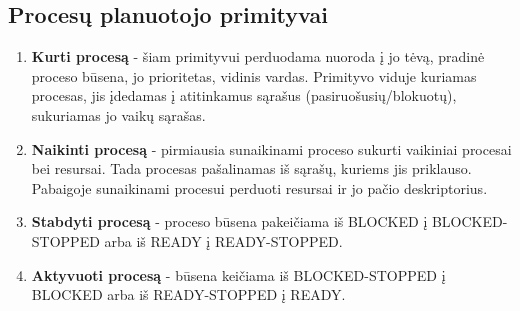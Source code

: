 	\subsection{Procesų planuotojo primityvai}
		\begin{enumerate}
			\item \textbf{Kurti procesą} - šiam primityvui perduodama nuoroda į jo tėvą, pradinė proceso būsena, jo prioritetas, vidinis vardas. Primityvo viduje kuriamas procesas, jis įdedamas į atitinkamus sąrašus (pasiruošusių/blokuotų), sukuriamas jo vaikų sąrašas.
			\item \textbf{Naikinti procesą} - pirmiausia sunaikinami proceso sukurti vaikiniai procesai bei resursai. Tada procesas pašalinamas iš sąrašų, kuriems jis priklauso. Pabaigoje sunaikinami procesui perduoti resursai ir jo pačio deskriptorius.
			\item \textbf{Stabdyti procesą} - proceso būsena pakeičiama iš BLOCKED į BLOCKED-STOPPED arba iš READY į READY-STOPPED.
			\item  \textbf{Aktyvuoti procesą} - būsena keičiama iš BLOCKED-STOPPED į BLOCKED arba iš READY-STOPPED į READY.
		\end{enumerate}
	\clearpage